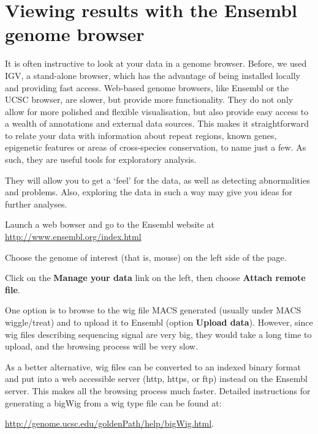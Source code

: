 \section{Viewing results with the Ensembl genome browser}

\begin{information}
It is often instructive to look at your data in a genome browser. Before, we
used IGV, a stand-alone browser, which has the advantage of being installed
locally and providing fast access. Web-based genome browsers, like Ensembl or
the UCSC browser, are slower, but provide more functionality. They do not only
allow for more polished and flexible visualisation, but also provide easy access
to a wealth of annotations and external data sources. This makes it
straightforward to relate your data with information about repeat regions, known
genes, epigenetic features or areas of cross-species conservation, to name just
a few. As such, they are useful tools for exploratory analysis.

They will allow you to get a `feel' for the data, as well as detecting
abnormalities and problems. Also, exploring the data in such a way may give you
ideas for further analyses.
\end{information}

\begin{steps}
Launch a web bowser and go to the Ensembl website at
\url{http://www.ensembl.org/index.html}

Choose the genome of interest (that is, mouse) on the left side of the page.

Click on the \textbf{Manage your data} link on the left, then choose
\textbf{Attach remote file}.

\end{steps}

\begin{note}
One option is to browse to the wig file MACS generated (usually under MACS
wiggle/treat) and to upload it to Ensembl (option \textbf{Upload data}).
However, since wig files describing sequencing signal are very big, they would
take a long time to upload, and the browsing process will be very slow.

As a better alternative, wig files can be converted to an indexed binary format
and put into a web accessible server (http, https, or ftp) instead on the
Ensembl server. This makes all the browsing process much faster. Detailed
instructions for generating a bigWig from a wig type file can be found at:

\url{http://genome.ucsc.edu/goldenPath/help/bigWig.html}.

\end{note}

